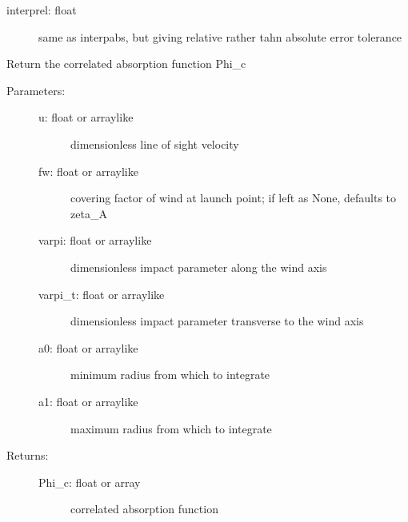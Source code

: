 \documentclass[letterpaper,10pt,english]{sphinxmanual}
\begin{document}
\begin{fulllineitems}
\begin{fulllineitems}
\begin{description}
\begin{description}
\item[{interprel: float}] \leavevmode
same as interpabs, but giving relative rather tahn
absolute error tolerance

\end{description}

\end{description}

\end{fulllineitems}


\begin{fulllineitems}
\label{fulldoc:despotic.winds.pwind.Phi_c}
Return the correlated absorption function Phi\_c
\begin{description}
\item[{Parameters:}] \leavevmode\begin{description}
\item[{u: float or arraylike}] \leavevmode
dimensionless line of sight velocity

\item[{fw: float or arraylike}] \leavevmode
covering factor of wind at launch point; if left as
None, defaults to zeta\_A

\item[{varpi: float or arraylike}] \leavevmode
dimensionless impact parameter along the wind axis

\item[{varpi\_t: float or arraylike}] \leavevmode
dimensionless impact parameter transverse to the wind axis

\item[{a0: float or arraylike}] \leavevmode
minimum radius from which to integrate

\item[{a1: float or arraylike}] \leavevmode
maximum radius from which to integrate

\end{description}

\item[{Returns:}] \leavevmode\begin{description}
\item[{Phi\_c: float or array}] \leavevmode
correlated absorption function

\end{description}


\end{description}
\end{fulllineitems}
\end{fulllineitems}
\end{document}

